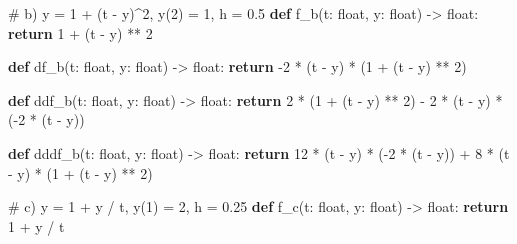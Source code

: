 \documentclass[
  letterpaper,
  DIV=11,
  numbers=noendperiod]{scrartcl}
\newenvironment{Shaded}{\begin{snugshade}}{\end{snugshade}}
\newcommand{\BuiltInTok}[1]{\textcolor[rgb]{0.00,0.23,0.31}{#1}}
\newcommand{\CommentTok}[1]{\textcolor[rgb]{0.37,0.37,0.37}{#1}}
\newcommand{\ControlFlowTok}[1]{\textcolor[rgb]{0.00,0.23,0.31}{\textbf{#1}}}
\newcommand{\DecValTok}[1]{\textcolor[rgb]{0.68,0.00,0.00}{#1}}
\newcommand{\KeywordTok}[1]{\textcolor[rgb]{0.00,0.23,0.31}{\textbf{#1}}}
\newcommand{\NormalTok}[1]{\textcolor[rgb]{0.00,0.23,0.31}{#1}}
\newcommand{\OperatorTok}[1]{\textcolor[rgb]{0.37,0.37,0.37}{#1}}
\begin{document}
\begin{Shaded}
\begin{Highlighting}[]
\CommentTok{\# b) y\textquotesingle{} = 1 + (t {-} y)\^{}2, y(2) = 1, h = 0.5}
\KeywordTok{def}\NormalTok{ f\_b(t: }\BuiltInTok{float}\NormalTok{, y: }\BuiltInTok{float}\NormalTok{) }\OperatorTok{{-}\textgreater{}} \BuiltInTok{float}\NormalTok{:}
    \ControlFlowTok{return} \DecValTok{1} \OperatorTok{+}\NormalTok{ (t }\OperatorTok{{-}}\NormalTok{ y) }\OperatorTok{**} \DecValTok{2}

\KeywordTok{def}\NormalTok{ df\_b(t: }\BuiltInTok{float}\NormalTok{, y: }\BuiltInTok{float}\NormalTok{) }\OperatorTok{{-}\textgreater{}} \BuiltInTok{float}\NormalTok{:}
    \ControlFlowTok{return} \OperatorTok{{-}}\DecValTok{2} \OperatorTok{*}\NormalTok{ (t }\OperatorTok{{-}}\NormalTok{ y) }\OperatorTok{*}\NormalTok{ (}\DecValTok{1} \OperatorTok{+}\NormalTok{ (t }\OperatorTok{{-}}\NormalTok{ y) }\OperatorTok{**} \DecValTok{2}\NormalTok{)}

\KeywordTok{def}\NormalTok{ ddf\_b(t: }\BuiltInTok{float}\NormalTok{, y: }\BuiltInTok{float}\NormalTok{) }\OperatorTok{{-}\textgreater{}} \BuiltInTok{float}\NormalTok{:}
    \ControlFlowTok{return} \DecValTok{2} \OperatorTok{*}\NormalTok{ (}\DecValTok{1} \OperatorTok{+}\NormalTok{ (t }\OperatorTok{{-}}\NormalTok{ y) }\OperatorTok{**} \DecValTok{2}\NormalTok{) }\OperatorTok{{-}} \DecValTok{2} \OperatorTok{*}\NormalTok{ (t }\OperatorTok{{-}}\NormalTok{ y) }\OperatorTok{*}\NormalTok{ (}\OperatorTok{{-}}\DecValTok{2} \OperatorTok{*}\NormalTok{ (t }\OperatorTok{{-}}\NormalTok{ y))}

\KeywordTok{def}\NormalTok{ dddf\_b(t: }\BuiltInTok{float}\NormalTok{, y: }\BuiltInTok{float}\NormalTok{) }\OperatorTok{{-}\textgreater{}} \BuiltInTok{float}\NormalTok{:}
    \ControlFlowTok{return} \DecValTok{12} \OperatorTok{*}\NormalTok{ (t }\OperatorTok{{-}}\NormalTok{ y) }\OperatorTok{*}\NormalTok{ (}\OperatorTok{{-}}\DecValTok{2} \OperatorTok{*}\NormalTok{ (t }\OperatorTok{{-}}\NormalTok{ y)) }\OperatorTok{+} \DecValTok{8} \OperatorTok{*}\NormalTok{ (t }\OperatorTok{{-}}\NormalTok{ y) }\OperatorTok{*}\NormalTok{ (}\DecValTok{1} \OperatorTok{+}\NormalTok{ (t }\OperatorTok{{-}}\NormalTok{ y) }\OperatorTok{**} \DecValTok{2}\NormalTok{)}


\CommentTok{\# c) y\textquotesingle{} = 1 + y / t, y(1) = 2, h = 0.25}
\KeywordTok{def}\NormalTok{ f\_c(t: }\BuiltInTok{float}\NormalTok{, y: }\BuiltInTok{float}\NormalTok{) }\OperatorTok{{-}\textgreater{}} \BuiltInTok{float}\NormalTok{:}
    \ControlFlowTok{return} \DecValTok{1} \OperatorTok{+}\NormalTok{ y }\OperatorTok{/}\NormalTok{ t}


\end{Highlighting}
\end{Shaded}
\end{document}
